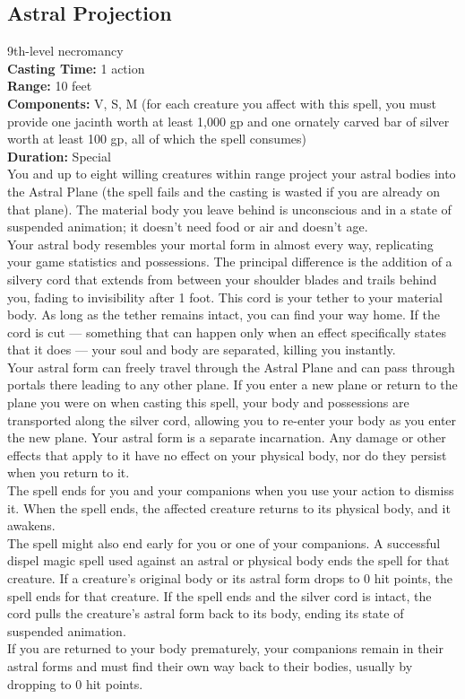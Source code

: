 \documentclass[11pt, A4paper, english]{article}
\begin{document}
		\subsection{Astral Projection}
9th-level necromancy \\
\textbf{Casting Time:} 1 action \\
\textbf{Range:} 10 feet \\
\textbf{Components:} V, S, M (for each creature you affect with this spell, you must provide one jacinth worth at least 1,000 gp and one ornately carved bar of silver worth at least 100 gp, all of which the spell consumes) \\
\textbf{Duration:} Special \\
You and up to eight willing creatures within range project your astral bodies into the Astral Plane (the spell fails and the casting is wasted if you are already on that plane). The material body you leave behind is unconscious and in a state of suspended animation; it doesn’t need food or air and doesn’t age. \\
Your astral body resembles your mortal form in almost every way, replicating your game statistics and possessions. The principal difference is the addition of a silvery cord that extends from between your shoulder blades and trails behind you, fading to invisibility after 1 foot. This cord is your tether to your material body. As long as the tether remains intact, you can find your way home. If the cord is cut — something that can happen only when an effect specifically states that it does — your soul and body are separated, killing you instantly. \\
Your astral form can freely travel through the Astral Plane and can pass through portals there leading to any other plane. If you enter a new plane or return to the plane you were on when casting this spell, your body and possessions are transported along the silver cord, allowing you to re-enter your body as you enter the new plane. Your astral form is a separate incarnation. Any damage or other effects that apply to it have no effect on your physical body, nor do they persist when you return to it. \\
The spell ends for you and your companions when you use your action to dismiss it. When the spell ends, the affected creature returns to its physical body, and it awakens. \\
The spell might also end early for you or one of your companions. A successful dispel magic spell used against an astral or physical body ends the spell for that creature. If a creature’s original body or its astral form drops to 0 hit points, the spell ends for that creature. If the spell ends and the silver cord is intact, the cord pulls the creature’s astral form back to its body, ending its state of suspended animation. \\
If you are returned to your body prematurely, your companions remain in their astral forms and must find their own way back to their bodies, usually by dropping to 0 hit points.
\end{document}
